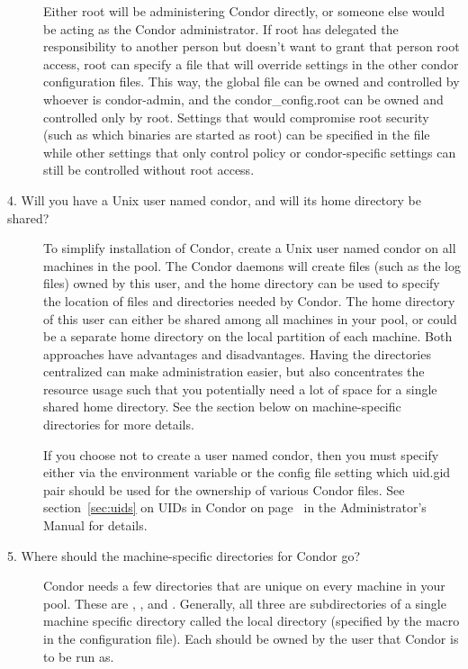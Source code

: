 \begin{description}
Either root will be administering Condor directly, or someone else
would be acting as the Condor administrator.  If root has delegated
the responsibility to another person but doesn't want to grant that
person root access, root can specify a 
 file that
will override settings in the other condor configuration
files.  This way,
the global 
 file can be owned and controlled by whoever
is condor-admin, and the 
condor\_config.root can be owned and
controlled only by root.  Settings that would compromise root security
(such as which binaries are started as root) can be specified in the
 file while other settings that only control policy
or condor-specific settings can still be controlled without root
access.  


\item[4. Will you have a Unix user named condor, and will its home
directory be shared?]

To simplify installation of Condor,
create a Unix user named condor on all machines in the pool.
The Condor daemons will create files
(such as the log files) owned by this user,
and the home directory can be used to specify the location of files
and directories needed by Condor.  The home directory of this user can
either be shared among all machines in your pool, or could be a
separate home directory on the local partition of each machine.  Both
approaches have advantages and disadvantages.  Having the directories
centralized can make administration easier, but also concentrates the
resource usage such that you potentially need a lot of space for a
single shared home directory.  See the section below on
machine-specific directories for more details.

If you choose not to create a user named condor,
then you must specify either via the
 environment variable or the 
config file setting which uid.gid pair should be used for
the ownership of various Condor files.  
See section~\ref{sec:uids} on UIDs in Condor on
page~\pageref{sec:uids} in the Administrator's Manual for details.

\item[5. Where should the machine-specific directories for
Condor go?]

Condor needs a few directories that are unique on every machine in
your pool.  These are 
, 
, and 
.  Generally, all
three are subdirectories of a single machine specific directory called
the local directory (specified by the  macro
in the configuration file).
Each should be owned by the user that Condor is to be run as.


\end{description}
